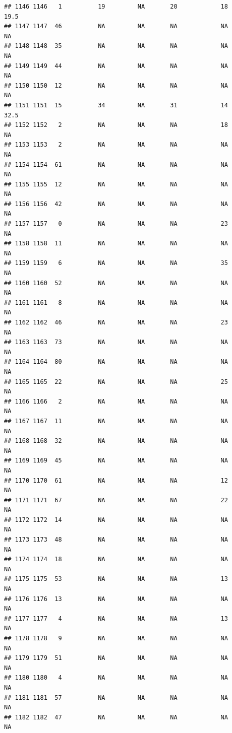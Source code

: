 \documentclass[man]{apa6}
\begin{document}
\begin{verbatim}
## 1146 1146   1          19         NA       20            18     19.5
## 1147 1147  46          NA         NA       NA            NA       NA
## 1148 1148  35          NA         NA       NA            NA       NA
## 1149 1149  44          NA         NA       NA            NA       NA
## 1150 1150  12          NA         NA       NA            NA       NA
## 1151 1151  15          34         NA       31            14     32.5
## 1152 1152   2          NA         NA       NA            18       NA
## 1153 1153   2          NA         NA       NA            NA       NA
## 1154 1154  61          NA         NA       NA            NA       NA
## 1155 1155  12          NA         NA       NA            NA       NA
## 1156 1156  42          NA         NA       NA            NA       NA
## 1157 1157   0          NA         NA       NA            23       NA
## 1158 1158  11          NA         NA       NA            NA       NA
## 1159 1159   6          NA         NA       NA            35       NA
## 1160 1160  52          NA         NA       NA            NA       NA
## 1161 1161   8          NA         NA       NA            NA       NA
## 1162 1162  46          NA         NA       NA            23       NA
## 1163 1163  73          NA         NA       NA            NA       NA
## 1164 1164  80          NA         NA       NA            NA       NA
## 1165 1165  22          NA         NA       NA            25       NA
## 1166 1166   2          NA         NA       NA            NA       NA
## 1167 1167  11          NA         NA       NA            NA       NA
## 1168 1168  32          NA         NA       NA            NA       NA
## 1169 1169  45          NA         NA       NA            NA       NA
## 1170 1170  61          NA         NA       NA            12       NA
## 1171 1171  67          NA         NA       NA            22       NA
## 1172 1172  14          NA         NA       NA            NA       NA
## 1173 1173  48          NA         NA       NA            NA       NA
## 1174 1174  18          NA         NA       NA            NA       NA
## 1175 1175  53          NA         NA       NA            13       NA
## 1176 1176  13          NA         NA       NA            NA       NA
## 1177 1177   4          NA         NA       NA            13       NA
## 1178 1178   9          NA         NA       NA            NA       NA
## 1179 1179  51          NA         NA       NA            NA       NA
## 1180 1180   4          NA         NA       NA            NA       NA
## 1181 1181  57          NA         NA       NA            NA       NA
## 1182 1182  47          NA         NA       NA            NA       NA

\end{verbatim}
\end{document}
